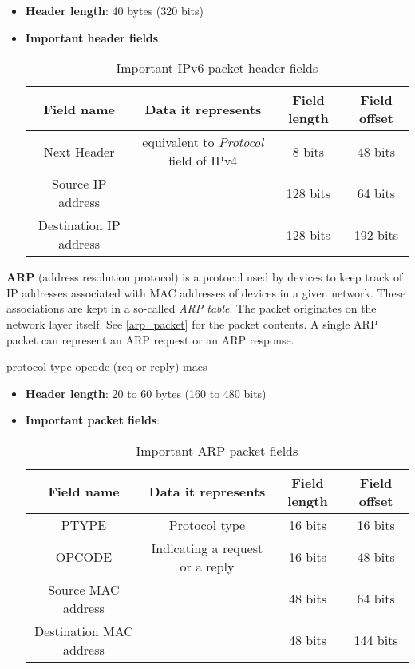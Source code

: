 \documentclass[a4paper]{article}
\begin{document}
  \begin{itemize}
    \item \textbf{Header length}: 40 bytes (320 bits)
    \item \textbf{Important header fields}:
      \begin{table}[h]
        \centering
        \begin{tabular}{|c|c|c|c|}
          \hline
          Field name & Data it represents & Field length & Field offset \\
          \hline
          \hline
          Next Header & equivalent to \textit{Protocol} field of IPv4 & 8 bits & 48 bits \\
          \hline
          Source IP address & & 128 bits & 64 bits \\
          \hline
          Destination IP address & & 128 bits & 192 bits \\
          \hline
        \end{tabular}
        \caption{Important IPv6 packet header fields}
      \end{table}
  \end{itemize}

  \vspace{1cm}


  \textbf{ARP} (address resolution protocol) is a protocol used by devices to 
  keep track of IP addresses associated with MAC addresses of devices in a 
  given network. These associations are kept in a so-called \textit{ARP table}.
  The packet originates on the network layer itself. See \ref{arp_packet} for
  the packet contents. A single ARP packet can represent an ARP request or an 
  ARP response.

  protocol type
  opcode (req or reply)
  macs
  \begin{itemize}
    \item \textbf{Header length}: 20 to 60 bytes (160 to 480 bits)
    \item \textbf{Important packet fields}:
      \begin{table}[h]
        \centering
        \begin{tabular}{|c|c|c|c|}
          \hline
          Field name & Data it represents & Field length & Field offset \\
          \hline
          \hline
          PTYPE & Protocol type & 16 bits & 16 bits \\
          \hline
          OPCODE & Indicating a request or a reply & 16 bits & 48 bits \\
          \hline
          Source MAC address & & 48 bits & 64 bits \\
          \hline
          Destination MAC address & & 48 bits & 144 bits \\
          \hline
        \end{tabular}
        \caption{Important ARP packet fields}
      \end{table}
  \end{itemize}
\end{document}
